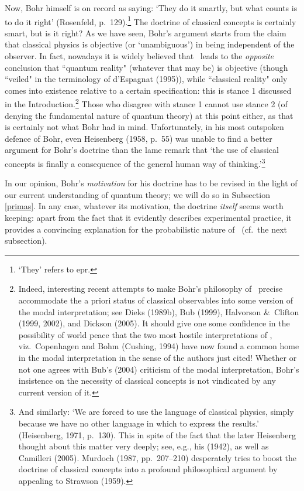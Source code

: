 \documentclass[12pt,titlepage]{article}
\newcommand{\epr}{{\sc epr}}
\begin{document}
Now,  Bohr himself is on record as saying: `They do it smartly, but what counts is to do it right' (Rosenfeld, p.\ 129).\footnote{`They' refers to \epr.}   
The doctrine of classical concepts is certainly smart, but is it right?
As we have seen, Bohr's argument starts from the claim that  classical physics is objective (or `unambiguous') in being independent of the observer. In fact, nowadays it is widely believed that \qm\ leads to the {\it opposite} conclusion that ``quantum reality" (whatever that may be) is objective (though ``veiled" in the terminology of d'Espagnat (1995)), while ``classical reality" only comes into existence relative to a certain specification: this is stance 1 discussed in the Introduction.\footnote{ Indeed,  interesting recent attempts to make  Bohr's philosophy of \qm\ precise accommodate the a priori status of classical observables into some version of the modal interpretation; see Dieks (1989b), Bub (1999),  Halvorson \&\ Clifton (1999, 2002), and Dickson (2005). It should give one some confidence in the possibility of world peace that the two most hostile interpretations of \qm, viz.\ Copenhagen and Bohm (Cushing, 1994) have now found a common home in the modal interpretation in the sense of the authors just cited! Whether or not one agrees with Bub's (2004) criticism of the modal interpretation, Bohr's insistence on the necessity of classical concepts is not vindicated by any current version  of it.}  
 Those who disagree with stance 1 cannot use stance 2 (of denying the fundamental nature of quantum theory) at this point either, as that is certainly not what Bohr had in mind.
 Unfortunately, in his most outspoken defence of Bohr, even  Heisenberg (1958, p.\ 55) was unable to find a better argument for Bohr's doctrine than the lame remark that `the use of classical concepts is finally a consequence of the general human way of thinking.'\footnote{And similarly: `We are forced to use the language of classical physics, simply because we have no other language in which to express the results.' (Heisenberg, 1971, p.\ 130). This in spite of the fact that the later Heisenberg thought about this matter very deeply; see, e.g., his (1942), as well as Camilleri (2005). Murdoch (1987, pp.\ 207--210) desperately tries to boost the doctrine of classical concepts into a profound philosophical argument by appealing to Strawson (1959).}

In our opinion, Bohr's {\it motivation} for his doctrine has to be revised in the light of our current understanding of quantum theory; we will do so in Subsection \ref{primas}. In any case, whatever its motivation, 
the doctrine {\it itself} seems worth keeping: apart from the fact that it evidently describes experimental practice, it provides a convincing explanation for the probabilistic nature of \qm\ (cf.\ the next subsection). 
\end{document}
